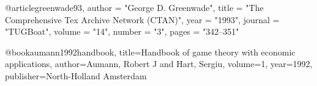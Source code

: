 @article{greenwade93,
    author  = "George D. Greenwade",
    title   = "The {C}omprehensive {T}ex {A}rchive {N}etwork ({CTAN})",
    year    = "1993",
    journal = "TUGBoat",
    volume  = "14",
    number  = "3",
    pages   = "342--351"
}

@book{aumann1992handbook,
  title={Handbook of game theory with economic applications},
  author={Aumann, Robert J and Hart, Sergiu},
  volume={1},
  year={1992},
  publisher={North-Holland Amsterdam}
}